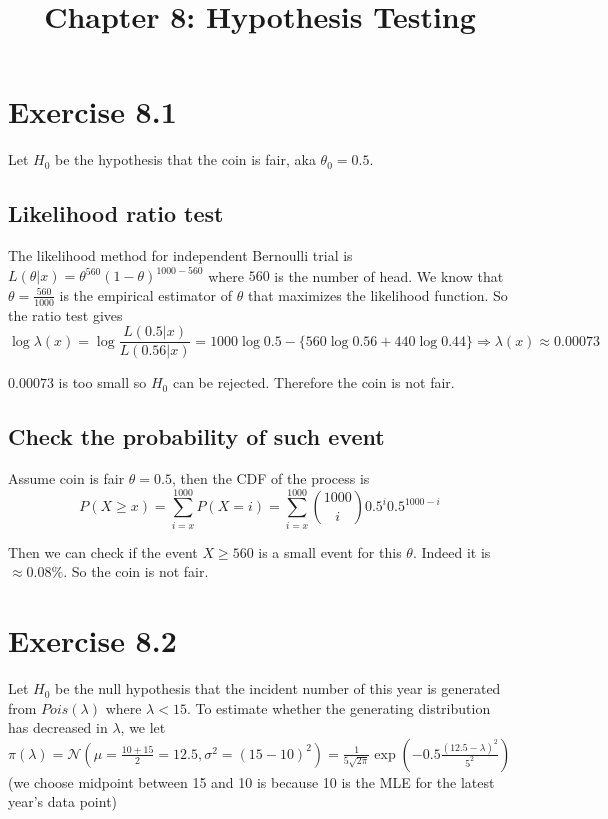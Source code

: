 \documentclass[12pt]{article}
\title{Chapter 8: Hypothesis Testing}
\begin{document}
\maketitle

\section*{Exercise 8.1}

Let $H_0$ be the hypothesis that the coin is fair, aka $\theta_0 = 0.5$.
\subsection*{Likelihood ratio test} 
The likelihood method for independent Bernoulli trial is $L(\theta | x) = \theta^{560} (1 - \theta)^{1000 - 560}$ where $560$ is the number of head. We know that $\theta=\frac{560}{1000}$ is the empirical estimator of $\theta$ that maximizes the likelihood function. So the ratio test gives 
 $$\log{\lambda(x)} = \log{\frac{  L(0.5 |x)}{L(0.56 | x)}} = 1000 \log{0.5} - \{560\log {0.56} + 440 \log {0.44}\} \Rightarrow \lambda(x) \approx  0.00073 $$

$0.00073$ is too small so $H_0$ can be rejected. Therefore the coin is not fair.

\subsection*{Check the probability of such event}
Assume coin is fair $\theta = 0.5$, then the CDF of the process is$$P(X \geq x) = \sum_{i = x}^{1000} P(X = i) = \sum_{i=x}^{1000} {1000 \choose i} 0.5^i 0.5^{1000 - i}$$

Then we can check if the event ${X \geq 560}$ is a small event for this $\theta$. Indeed it is $\approx0.08\%$. So the coin is not fair.

\section*{Exercise 8.2}
Let $H_0$ be the null hypothesis that the incident number of this year is generated from $Pois(\lambda)$ where $\lambda < 15$. To estimate whether the generating distribution has decreased in $\lambda$, we let $\pi(\lambda) = \mathcal{N}(\mu = \frac{10+15}{2} = 12.5, \sigma^2 = (15-10)^2) = \frac{1}{5 \sqrt{2 \pi}}\exp(- 0.5 \frac{(12.5 - \lambda)^2}{5^2})$ (we choose midpoint between 15 and 10 is because 10 is the MLE for the latest year's data point)
\end{document}
